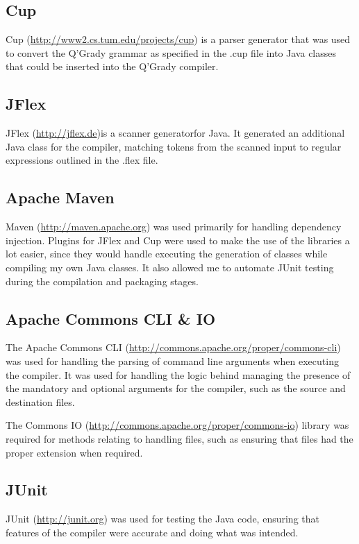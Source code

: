 \documentclass[report.tex]{subfiles}
\begin{document}
\subsection{Cup} %
\label{sub:cup}
Cup (\url{http://www2.cs.tum.edu/projects/cup}) is a parser generator that was
used to convert the Q'Grady grammar as specified in the .cup file into Java
classes that could be inserted into the Q'Grady compiler.

\subsection{JFlex} %
\label{sub:jflex}
JFlex (\url{http://jflex.de})is a scanner generatorfor Java. It generated an
additional Java class for the compiler, matching tokens from the scanned input
to regular expressions outlined in the .flex file.

\subsection{Apache Maven} %
\label{sub:apache_maven}
Maven (\url{http://maven.apache.org}) was used primarily for handling dependency
injection. Plugins for JFlex and Cup were used to make the use of the libraries
a lot easier, since they would handle executing the generation of classes while
compiling my own Java classes. It also allowed me to automate JUnit testing
during the compilation and packaging stages.

\subsection{Apache Commons CLI \& IO} %
\label{sub:apache_commons_cli}
The Apache Commons CLI (\url{http://commons.apache.org/proper/commons-cli}) was
used for handling the parsing of command line arguments when executing the
compiler. It was used for handling the logic behind managing the presence of
the mandatory and optional arguments for the compiler, such as the source and
destination files.

The Commons IO (\url{http://commons.apache.org/proper/commons-io}) library was
required for methods relating to handling files, such as ensuring that files
had the proper extension when required.

\subsection{JUnit} %
\label{sub:junit}
JUnit (\url{http://junit.org}) was used for testing the Java code, ensuring that
features of the compiler were accurate and doing what was intended.
\end{document}
